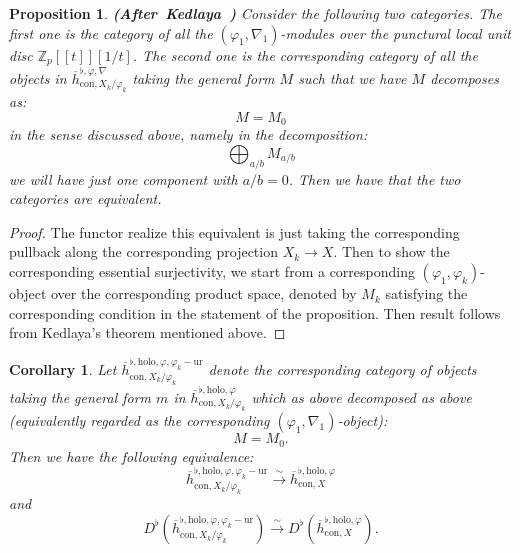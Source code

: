 \documentclass[11pt]{book}
\newtheorem{proposition}[theorem]{Proposition}
\newtheorem{corollary}[theorem]{Corollary}
\theoremstyle{definition}
\numberwithin{equation}{section}
\begin{document}
\begin{proposition}\mbox{\bf{(After Kedlaya \cite[Theorem 7.3, Corollary 7.4]{Ked9})}} \label{proposition5.14}
Consider the following two categories. The first one is the category of all the $(\varphi_1,\nabla_1)$-modules over the punctural local unit disc $\mathbb{Z}_p[[t]][1/t]$. The second one is the corresponding category of all the objects in $\overline{h}^{\flat,\varphi,\nabla}_{\mathrm{con},X_k/\varphi_k}$ taking the general form $M$ such that we have $M$ decomposes as:
\begin{displaymath}
M=M_{0}	
\end{displaymath}
in the sense discussed above, namely in the decomposition:
\begin{displaymath}
\bigoplus_{a/b}M_{a/b}	
\end{displaymath}
we will have just one component with $a/b=0$. Then we have that the two categories are equivalent.
\end{proposition}


\begin{proof}
The functor realize this equivalent is just taking the corresponding pullback along the corresponding projection $X_k\rightarrow X$. Then to show the corresponding essential surjectivity, we start from a corresponding $(\varphi_1,\varphi_k)$-object over the corresponding product space, denoted by $M_k$ satisfying the corresponding condition in the statement of the proposition. Then result follows from Kedlaya's theorem mentioned above.	
\end{proof}



\begin{corollary} \label{corollary5.15}
Let $\overline{h}^{\flat,\mathrm{holo},\varphi,\varphi_k-\mathrm{ur}}_{\mathrm{con},X_k/\varphi_k}$ denote the corresponding category of objects taking the general form $m$ in $\overline{h}^{\flat,\mathrm{holo},\varphi}_{\mathrm{con},X_k/\varphi_k}$ which as above decomposed as above (equivalently regarded as the corresponding $(\varphi_1,\nabla_1)$-object):
\begin{displaymath}
M=M_0.	
\end{displaymath}
Then we have the following equivalence:
\begin{displaymath}
\overline{h}^{\flat,\mathrm{holo},\varphi,\varphi_k-\mathrm{ur}}_{\mathrm{con},X_k/\varphi_k} \overset{\sim}{\rightarrow} \overline{h}^{\flat,\mathrm{holo},\varphi}_{\mathrm{con},X}	
\end{displaymath}
and 
\begin{displaymath}
D^\flat(\overline{h}^{\flat,\mathrm{holo},\varphi,\varphi_k-\mathrm{ur}}_{\mathrm{con},X_k/\varphi_k}) \overset{\sim}{\rightarrow} D^\flat(\overline{h}^{\flat,\mathrm{holo},\varphi}_{\mathrm{con},X}).	
\end{displaymath}	
\end{corollary}
\end{document}
